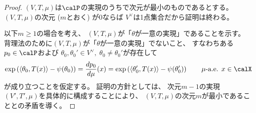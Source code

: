 \documentclass[report]{jlreq}
\begin{document}
\begin{proof}
    $(V, T, \mu)$は$\calP$の実現のうちで次元が最小のものであるとする。
    $(V, T, \mu)$の次元 ($m$とおく) が$0$ならば
    $V^\vee$は1点集合だから証明は終わる。

    以下$m \ge 1$の場合を考え、
    $(V, T, \mu)$が「$\theta$が一意の実現」であることを示す。
    背理法のために$(V, T, \mu)$が「$\theta$が一意の実現」でないこと、
    すなわちある$p_0 \in \calP$および
    $\theta_0, \theta_0' \in V^\vee, \; \theta_0 \neq \theta_0'$が存在して
    \begin{equation}
        \locallabel{eq:assumption}
        \exp\myparen{\langle \theta_0, T(x) \rangle - \psi(\theta_0)}
            = \dd[p_0]{\mu}(x)
            = \exp\myparen{\langle \theta_0', T(x) \rangle - \psi(\theta_0')}
            \qquad
            \text{$\mu$-a.e. $x \in \calX$}
    \end{equation}
    が成り立つことを仮定する。
    証明の方針としては、
    次元$m - 1$の実現$(V', T', \mu)$を具体的に構成することにより、
    $(V, T, \mu)$の次元$m$が最小であることとの矛盾を導く。


\end{proof}
\end{document}
